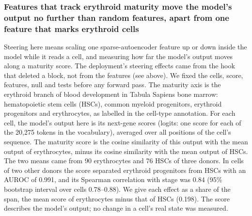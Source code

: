 \subsubsection*{Features that track erythroid maturity move the model's output no further than random features, apart from one feature that marks erythroid cells}
Steering here means scaling one sparse-autoencoder feature up or down
inside the model while it reads a cell, and measuring how far the model's
output moves along a maturity score. The deployment's steering effects
came from the hook that deleted a block, not from the features (see
above). We fixed the cells, score, features, null and tests before any
forward pass. The maturity axis is the erythroid branch of blood
development in Tabula Sapiens bone marrow: hematopoietic stem cells
(HSCs), common myeloid progenitors, erythroid progenitors and
erythrocytes, as labelled in the cell-type annotation. For each cell,
the model's output here is its next-gene scores (logits: one score for
each of the 20,275 tokens in the vocabulary), averaged over all
positions of the cell's sequence. The maturity score is the cosine
similarity of this output with the mean output of erythrocytes, minus
its cosine similarity with the mean output of HSCs. The two means came
from 90 erythrocytes and 76 HSCs of three donors. In cells of two other
donors the score separated erythroid progenitors from HSCs with an AUROC
of 0.991, and its Spearman correlation with stage was 0.84 (95\% bootstrap interval over
cells 0.78--0.88). We give each effect as a share of the span, the mean
score of erythrocytes minus that of HSCs (0.198). The score describes the
model's output; no change in a cell's real state was measured.

